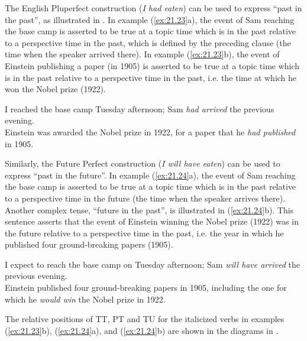 The English Pluperfect construction (\textit{I had eaten}) can be used to express “past in the past”, as illustrated in . In example (\ref{ex:21.23}a), the event of Sam reaching the base camp is asserted to be true at a topic time which is in the past relative to a perspective time in the past, which is defined by the preceding clause (the time when the speaker arrived there). In example (\ref{ex:21.23}b), the event of Einstein publishing a paper (in 1905) is asserted to be true at a topic time which is in the past relative to a perspective time in the past, i.e. the time at which he won the Nobel prize (1922).


\ea \label{ex:21.23}
\ea  I reached the base camp Tuesday afternoon; Sam \textit{had arrived} the previous evening.\\
\ex Einstein was awarded the Nobel prize in 1922, for a paper that he \textit{had published} in 1905.
                       \z
\z


Similarly, the Future Perfect construction (\textit{I will have eaten}) can be used to express “past in the future”. In example (\ref{ex:21.24}a), the event of Sam reaching the base camp is asserted to be true at a topic time which is in the past relative to a perspective time in the future (the time when the speaker arrives there). Another complex tense, “future in the past”, is illustrated in (\ref{ex:21.24}b). This sentence asserts that the event of Einstein winning the Nobel prize (1922) was in the future relative to a perspective time in the past, i.e. the year in which he published four ground-breaking papers (1905).


\ea \label{ex:21.24}
\ea  I expect to reach the base camp on Tuesday afternoon; Sam \textit{will have arrived} the previous evening.\\
\ex Einstein published four ground-breaking papers in 1905, including the one for which he \textit{would win} the Nobel prize in 1922.
                       \z
\z


The relative positions of TT, PT and TU for the italicized verbs in examples (\ref{ex:21.23}b), (\ref{ex:21.24}a), and (\ref{ex:21.24}b) are shown in the diagrams in .


